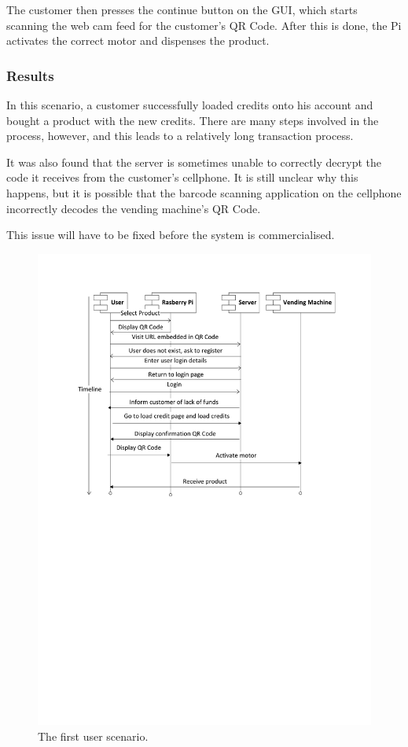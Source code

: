 The customer then presses the continue button on the GUI, which starts scanning the web
cam feed for the customer's QR Code. After this is done, the Pi activates the correct
motor and dispenses the product.

\subsubsection{Results}

In this scenario, a customer successfully loaded credits onto his account and bought a
product with the new credits. There are many steps involved in the process, however, and
this leads to a relatively long transaction process. 

It was also found that the server is sometimes unable to correctly decrypt the code it
receives from the customer's cellphone. It is still unclear why this happens, but it is
possible that the barcode scanning application on the cellphone incorrectly decodes the
vending machine's QR Code. 

This issue will have to be fixed before the system is commercialised.

\begin{figure}
 \centering 
 \includegraphics[clip=true, trim = 0 410 0 60,
 scale=0.7]{user_story_1}
 \caption{The first user scenario.}
 \label{fig:test1}
\end{figure}

